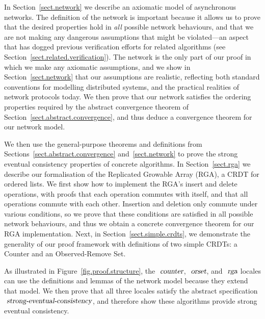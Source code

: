 In Section~\ref{sect.network} we describe an axiomatic model of asynchronous networks.
The definition of the network is important because it allows us to prove that the desired properties hold in \emph{all} possible network behaviours, and that we are not making any dangerous assumptions that might be violated---an aspect that has dogged previous verification efforts for related algorithms (see Section~\ref{sect.related.verification}).
The network is the only part of our proof in which we make any axiomatic assumptions, and we show in Section~\ref{sect.network} that our assumptions are realistic, reflecting both standard conventions for modelling distributed systems, and the practical realities of network protocols today.
We then prove that our network satisfies the ordering properties required by the abstract convergence theorem of Section~\ref{sect.abstract.convergence}, and thus deduce a convergence theorem for our network model.

We then use the general-purpose theorems and definitions from Sections~\ref{sect.abstract.convergence} and~\ref{sect.network} to prove the strong eventual consistency properties of concrete algorithms.
In Section~\ref{sect.rga} we describe our formalisation of the Replicated Growable Array (RGA), a CRDT for ordered lists.
We first show how to implement the RGA's insert and delete operations, with proofs that each operation commutes with itself, and that all operations commute with each other.
Insertion and deletion only commute under various conditions, so we prove that these conditions are satisfied in all possible network behaviours, and thus we obtain a concrete convergence theorem for our RGA implementation.
Next, in Section~\ref{sect.simple.crdts}, we demonstrate the generality of our proof framework with definitions of two simple CRDTs: a Counter and an Observed-Remove Set.

As illustrated in Figure~\ref{fig.proof.structure}, the $\isa{counter}$, $\isa{orset}$, and $\isa{rga}$ locales can use the definitions and lemmas of the network model because they extend that model.
We then prove that all three locales satisfy the abstract specification $\isa{strong-eventual-consistency}$, and therefore show these algorithms provide strong eventual consistency.

